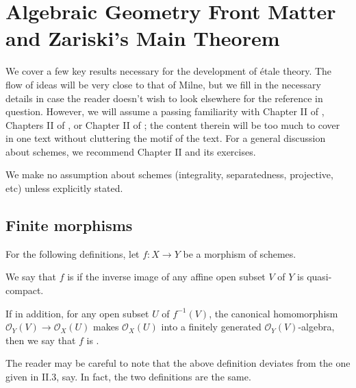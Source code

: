 \chapter{Algebraic Geometry Front Matter and Zariski's Main 
Theorem}
\label{sect_zariski}

\renewcommand{\O}{\mathcal{O}}

We cover a few key results necessary for the development of 
\'etale theory. The flow of ideas will be very close to that of 
Milne, but we fill in the necessary details in case the reader 
doesn't wish to look elsewhere for the reference in question. 
However, we will assume a passing familiarity with Chapter II of 
\cite{Hart}, Chapters II of \cite{Liu}, or Chapter II of 
\cite{Mum}; the content therein will be too much to cover in one 
text without cluttering the motif of the text. For a general 
discussion about schemes, we recommend \cite{Hart} Chapter II
and its exercises.

We make no assumption about schemes (integrality, separatedness, 
projective, etc) unless explicitly stated. 

\section{Finite morphisms}

For the following definitions, let $f: X \to Y$ be a morphism of 
schemes.

\begin{defn}
We say that $f$ is 
if the inverse image of any affine open subset $V$ of $Y$ is
quasi-compact. 

If in addition, for any open subset $U$ of $f^{-1}(V)$, the 
canonical homomorphism $\O_Y(V) \to \O_X(U)$ makes $\O_X(U)$ into 
a finitely generated $\O_Y(V)$-algebra, then we say that $f$ is 
.
\end{defn}

The reader may be careful to note that the above definition
deviates from the one given in \cite{Hart} II.3, say. In fact,
the two definitions are the same.

